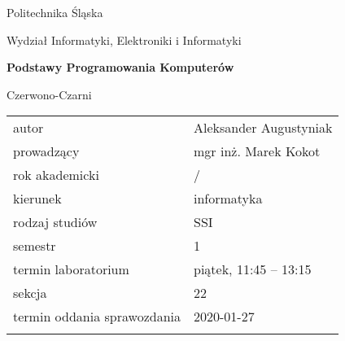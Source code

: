 \documentclass[12pt,a4paper,twoside]{article}
\newcounter{rok}
\newcommand{\rokakademicki}{%
   \setcounter{rok}{\number\year}%
   \ifthenelse{\number\month<10}%
   {\addtocounter{rok}{-1}}%
   {}%
   \arabic{rok}/\addtocounter{rok}{1}\arabic{rok}
}
\begin{document}
\frenchspacing
\thispagestyle{empty}
\begin{center}
{\Large\sf Politechnika Śląska   %

Wydział Informatyki, Elektroniki i Informatyki

}

\vfill

 

\vfill\vfill

{\Huge\sffamily\bfseries Podstawy Programowania Komputerów\par}  

\vfill\vfill

{\LARGE\sf Czerwono-Czarni}   


\vfill \vfill\vfill\vfill






\begin{tabular}{ll}
	\toprule
	autor                       & Aleksander Augustyniak     \\
	prowadzący                  & mgr inż. Marek Kokot  \\
	rok akademicki              & \rokakademicki         \\
	kierunek                    & informatyka            \\
	rodzaj studiów              & SSI                    \\
	semestr                     & 1                      \\
	termin laboratorium         & piątek, 11:45 – 13:15 \\
	sekcja                      & 22                     \\
	termin oddania sprawozdania & 2020-01-27             \\
	\bottomrule
	                            &
\end{tabular}

\end{center}

\cleardoublepage

\end{document}
